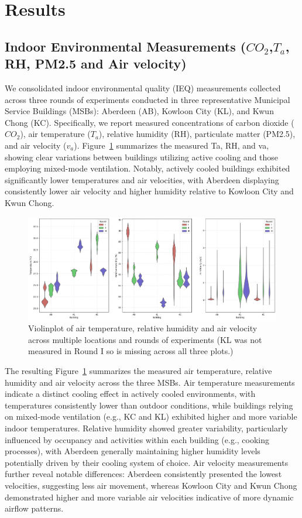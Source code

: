 \documentclass[preprint,12pt]{elsarticle}
\begin{document}
\section{Results}
\subsection{Indoor Environmental Measurements ($CO_2$,$T_a$, RH, PM2.5 and Air velocity)}
We consolidated indoor environmental quality (IEQ) measurements collected across three rounds of experiments conducted in three representative Municipal Service Buildings (MSBs): Aberdeen (AB), Kowloon City (KL), and Kwun Chong (KC). Specifically, we report measured concentrations of carbon dioxide ($CO_2$), air temperature ($T_a$), relative humidity (RH), particulate matter (PM2.5), and air velocity ($v_a$). Figure~\ref{fig:TaRHva} summarizes the measured Ta, RH, and va, showing clear variations between buildings utilizing active cooling and those employing mixed-mode ventilation. Notably, actively cooled buildings exhibited significantly lower temperatures and air velocities, with Aberdeen displaying consistently lower air velocity and higher humidity relative to Kowloon City and Kwun Chong.


    \begin{figure}[h!]
        \centering
        \includegraphics[width=\linewidth]{img/TaRHva.png}
        \caption{Violinplot of air temperature, relative humidity and air velocity across multiple locations and rounds of experiments (KL was not measured in Round I so is missing across all three plots.)}
        \label{fig:TaRHva}
    \end{figure}

The resulting Figure~\ref{fig:TaRHva} summarizes the measured air temperature, relative humidity and air velocity across the three MSBs. Air temperature measurements indicate a distinct cooling effect in actively cooled environments, with temperatures consistently lower than outdoor conditions, while buildings relying on mixed-mode ventilation (e.g., KC and KL) exhibited higher and more variable indoor temperatures. Relative humidity showed greater variability, particularly influenced by occupancy and activities within each building (e.g., cooking processes), with Aberdeen generally maintaining higher humidity levels potentially driven by their cooling system of choice. Air velocity measurements further reveal notable differences: Aberdeen consistently presented the lowest velocities, suggesting less air movement, whereas Kowloon City and Kwun Chong demonstrated higher and more variable air velocities indicative of more dynamic airflow patterns.
\end{document}
